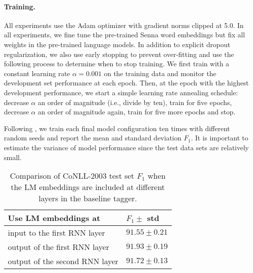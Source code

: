 \documentclass[11pt,a4paper]{article}
\begin{document}
\paragraph{Training.}
All experiments use the Adam optimizer \cite{Kingma2014AdamAM} with gradient norms clipped at 5.0.
In all experiments, we fine tune the pre-trained Senna word embeddings but fix all weights in the
pre-trained language models.  In addition to explicit dropout regularization, we also use early
stopping to prevent over-fitting and use
the following process to determine when to stop training.
We first train with a constant learning rate $\alpha = 0.001$ on the training data and monitor the development set performance at each epoch.  Then, at the epoch with the highest development performance, we start a simple learning rate annealing schedule: decrease $\alpha$ an order of magnitude (i.e., divide by ten), train for five epochs, decrease
$\alpha$ an order of magnitude again, train for five more epochs and stop.

Following \citet{chiu-nichols-2016}, we train each final model configuration ten times with different random seeds and report the mean and standard deviation $F_1$.
It is important to estimate the variance of model performance since the test data sets are relatively small.

\begin{table}[t]
\begin{center}
\begin{tabular}{l|l}
\hline \hline
\bf Use LM embeddings at & \bf $F_1 \pm$ std \\ \hline
input to the first RNN layer & $91.55 \pm 0.21$ \\
output of the first RNN layer & $\mathbf{91.93 \pm 0.19}$ \\
output of the second RNN layer & $91.72 \pm 0.13$ \\
\hline \hline
\end{tabular}
\end{center}
\caption{\label{2003-table-lm-level} Comparison of CoNLL-2003 test set $F_1$ when the LM embeddings are included at different layers in the baseline tagger.
}
\end{table}
\end{document}

